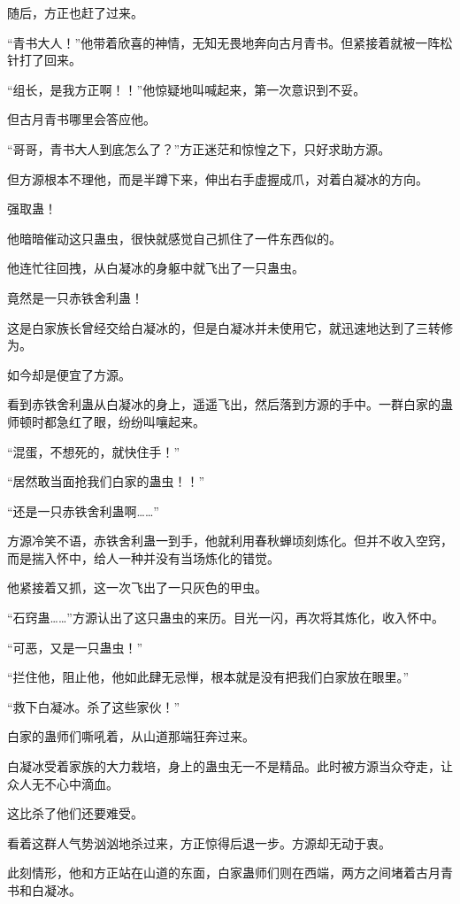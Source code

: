 
\begin{this_body}

随后，方正也赶了过来。

“青书大人！”他带着欣喜的神情，无知无畏地奔向古月青书。但紧接着就被一阵松针打了回来。

“组长，是我方正啊！！”他惊疑地叫喊起来，第一次意识到不妥。

但古月青书哪里会答应他。

“哥哥，青书大人到底怎么了？”方正迷茫和惊惶之下，只好求助方源。

但方源根本不理他，而是半蹲下来，伸出右手虚握成爪，对着白凝冰的方向。

强取蛊！

他暗暗催动这只蛊虫，很快就感觉自己抓住了一件东西似的。

他连忙往回拽，从白凝冰的身躯中就飞出了一只蛊虫。

竟然是一只赤铁舍利蛊！

这是白家族长曾经交给白凝冰的，但是白凝冰并未使用它，就迅速地达到了三转修为。

如今却是便宜了方源。

看到赤铁舍利蛊从白凝冰的身上，遥遥飞出，然后落到方源的手中。一群白家的蛊师顿时都急红了眼，纷纷叫嚷起来。

“混蛋，不想死的，就快住手！”

“居然敢当面抢我们白家的蛊虫！！”

“还是一只赤铁舍利蛊啊……”

方源冷笑不语，赤铁舍利蛊一到手，他就利用春秋蝉顷刻炼化。但并不收入空窍，而是揣入怀中，给人一种并没有当场炼化的错觉。

他紧接着又抓，这一次飞出了一只灰色的甲虫。

“石窍蛊……”方源认出了这只蛊虫的来历。目光一闪，再次将其炼化，收入怀中。

“可恶，又是一只蛊虫！”

“拦住他，阻止他，他如此肆无忌惮，根本就是没有把我们白家放在眼里。”

“救下白凝冰。杀了这些家伙！”

白家的蛊师们嘶吼着，从山道那端狂奔过来。

白凝冰受着家族的大力栽培，身上的蛊虫无一不是精品。此时被方源当众夺走，让众人无不心中滴血。

这比杀了他们还要难受。

看着这群人气势汹汹地杀过来，方正惊得后退一步。方源却无动于衷。

此刻情形，他和方正站在山道的东面，白家蛊师们则在西端，两方之间堵着古月青书和白凝冰。


\end{this_body}
